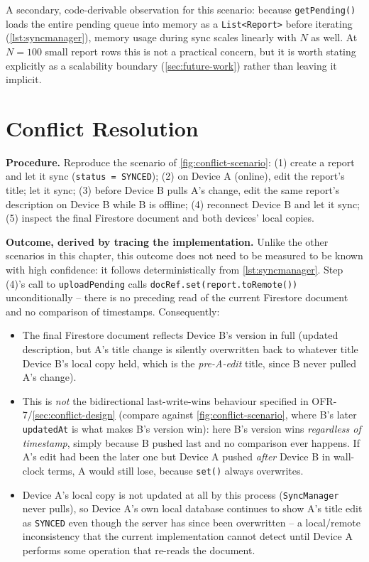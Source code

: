 A secondary, code-derivable observation for this scenario: because
\texttt{getPending()} loads the entire pending queue into memory as a
\texttt{List<Report>} before iterating (\cref{lst:syncmanager}), memory
usage during sync scales linearly with $N$ as well. At $N=100$ small
report rows this is not a practical concern, but it is worth stating
explicitly as a scalability boundary (\cref{sec:future-work}) rather than
leaving it implicit.

\section{Conflict Resolution}
\label{sec:eval-conflict}
\label{sec:conflict-eval}

\textbf{Procedure.} Reproduce the scenario of \cref{fig:conflict-scenario}:
(1) create a report and let it sync (\texttt{status = SYNCED}); (2) on
Device A (online), edit the report's title; let it sync; (3) before
Device B pulls A's change, edit the same report's description on Device B
while B is offline; (4) reconnect Device B and let it sync; (5) inspect the
final Firestore document and both devices' local copies.

\textbf{Outcome, derived by tracing the implementation.} Unlike the other
scenarios in this chapter, this outcome does not need to be measured to be
known with high confidence: it follows deterministically from
\cref{lst:syncmanager}. Step (4)'s call to \texttt{uploadPending} calls
\texttt{docRef.set(report.toRemote())} unconditionally -- there is no
preceding read of the current Firestore document and no comparison of
timestamps. Consequently:

\begin{itemize}
  \item The final Firestore document reflects Device B's version in full
  (updated description, but A's title change is silently overwritten back
  to whatever title Device B's local copy held, which is the
  \emph{pre-A-edit} title, since B never pulled A's change).
  \item This is \emph{not} the bidirectional last-write-wins behaviour
  specified in OFR-7/\cref{sec:conflict-design} (compare against
  \cref{fig:conflict-scenario}, where B's later \texttt{updatedAt} is
  what makes B's version win): here B's version wins \emph{regardless of
  timestamp}, simply because B pushed last and no comparison ever
  happens. If A's edit had been the later one but Device A pushed
  \emph{after} Device B in wall-clock terms, A would still lose, because
  \texttt{set()} always overwrites.
  \item Device A's local copy is not updated at all by this process
  (\texttt{SyncManager} never pulls), so Device A's own local database
  continues to show A's title edit as \texttt{SYNCED} even though the
  server has since been overwritten -- a local/remote inconsistency that
  the current implementation cannot detect until Device A performs some
  operation that re-reads the document.
\end{itemize}

